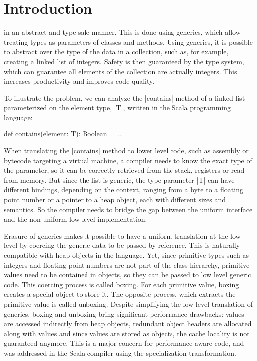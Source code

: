 \section{Introduction}

 in an abstract and type-safe manner. This is done using generics, which allow treating types as parameters of classes and methods. Using generics, it is possible to abstract over the type of the data in a collection, such as, for example, creating a linked list of integers. Safety is then guaranteed by the type system, which can guarantee all elements of the collection are actually integers. This increases productivity and improves code quality.




 To illustrate the problem, we can analyze the |contains| method of a linked list parameterized on the element type, |T|, written in the Scala programming language:

\begin{lstlisting-nobreak}
 def contains(element: T): Boolean = ...
\end{lstlisting-nobreak}

When translating the |contains| method to lower level code, such as assembly or bytecode targeting a virtual machine, a compiler needs to know the exact type of the parameter, so it can be correctly retrieved from the stack, registers or read from memory. But since the list is generic, the type parameter |T| can have different bindings, depending on the context, ranging from a byte to a floating point number or a pointer to a heap object, each with different sizes and semantics. So the compiler needs to bridge the gap between the uniform interface and the non-uniform low level implementation.

 Erasure of generics makes it possible to have a uniform translation at the low level by coercing the generic data to be passed by reference. This is naturally compatible with heap objects in the language. Yet, since primitive types such as integers and floating point numbers are not part of the class hierarchy, primitive values need to be contained in objects, so they can be passed to low level generic code. This coercing process is called boxing. For each primitive value, boxing creates a special object to store it. The opposite process, which extracts the primitive value is called unboxing. Despite simplifying the low level translation of generics, boxing and unboxing bring significant performance drawbacks: values are accessed indirectly from heap objects, redundant object headers are allocated along with values and since values are stored as objects, the cache locality is not guaranteed anymore. This is a major concern for performance-aware code, and was addressed in the Scala compiler using the specialization transformation.

